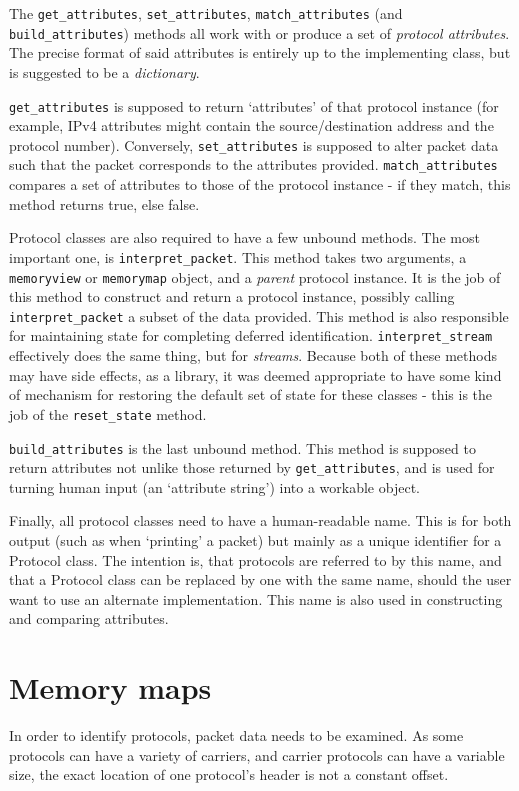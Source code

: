 \documentclass[10pt,a4paper,notitlepage,twoside]{report}
\begin{document}
The \texttt{get_attributes}, \texttt{set_attributes}, \texttt{match_attributes} (and \texttt{build_attributes})  methods all work with or produce  a set of \emph{protocol attributes}. The precise format of said attributes is entirely up to the implementing class, but is suggested to be a \emph{dictionary}.

\texttt{get_attributes} is supposed to return `attributes' of that protocol instance (for example, IPv4 attributes might contain the source/destination address and the protocol number). Conversely, \texttt{set_attributes} is supposed to alter packet data such that the packet corresponds to the attributes provided. \texttt{match_attributes} compares a set of attributes to those of the protocol instance - if they match, this method returns true, else false.

Protocol classes are also required to have a few unbound methods. The most important one, is \texttt{interpret_packet}. 
This method takes two arguments, a \texttt{memoryview} or \texttt{memorymap} object, and a \emph{parent} protocol instance. It is the job of this method to construct and return a protocol instance, possibly calling \texttt{interpret_packet} a subset of the data provided. This method is also responsible for maintaining state for completing deferred identification. \texttt{interpret_stream} effectively does the same thing, but for \emph{streams}.
Because both of these methods may have side effects, as a library, it was deemed appropriate to have some kind of mechanism for restoring the default set of state for these classes - this is the job of the \texttt{reset_state} method.

\texttt{build_attributes} is the last unbound method. This method is supposed to return attributes not unlike those returned by \texttt{get_attributes}, and is used for turning human input (an `attribute string') into a workable object.

Finally, all protocol classes need to have a human-readable name. This is for both output (such as when `printing' a packet) but mainly as a unique identifier for a Protocol class. The intention is, that protocols are referred to by this name, and that a Protocol class can be replaced by one with the same name, should the user want to use an alternate implementation. This name is also used in constructing and comparing attributes.

\section{Memory maps}
\label{sec:memmap}
In order to identify protocols, packet data needs to be examined. As some protocols can have a variety of carriers, and carrier protocols can have a variable size, the exact location of one protocol's header is not a constant offset.
\end{document}
